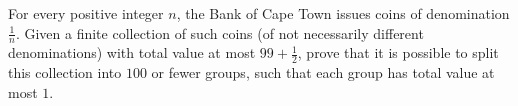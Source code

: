 For every positive integer $n$,
the Bank of Cape Town issues coins of denomination $\frac 1n$.
Given a finite collection of such coins (of not necessarily different denominations)
with total value at most $99 + \frac12$, prove that it is possible to split
this collection into $100$ or fewer groups, such that each group has total value at most $1$.